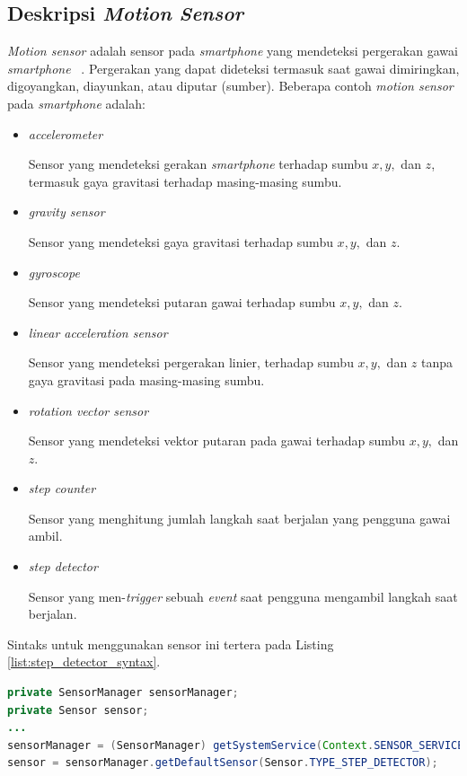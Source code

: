 \subsection{Deskripsi \textit{Motion Sensor}}
\textit{Motion sensor} adalah sensor pada \textit{smartphone} yang mendeteksi pergerakan gawai \textit{smartphone} ~\cite{motion-sensor}. Pergerakan yang dapat dideteksi termasuk saat gawai dimiringkan, digoyangkan, diayunkan, atau diputar (sumber). Beberapa contoh \textit{motion sensor} pada \textit{smartphone} adalah:
\begin{itemize}
	\item \textit{accelerometer}
	
	Sensor yang mendeteksi gerakan \textit{smartphone} terhadap sumbu $x, y,$ dan $z$, termasuk gaya gravitasi terhadap masing-masing sumbu.
	\item \textit{gravity sensor}
	
	Sensor yang mendeteksi gaya gravitasi terhadap sumbu $x, y,$ dan $z$.
	\item \textit{gyroscope}
	
	Sensor yang mendeteksi putaran gawai terhadap sumbu $x, y,$ dan $z$.
	\item \textit{linear acceleration sensor}
	
	Sensor yang mendeteksi pergerakan linier, terhadap sumbu $x, y,$ dan $z$ tanpa gaya gravitasi pada masing-masing sumbu.
	\item \textit{rotation vector sensor}
	
	Sensor yang mendeteksi vektor putaran pada gawai terhadap sumbu $x, y,$ dan $z$.
	
	\item \textit{step counter}
	
	Sensor yang menghitung jumlah langkah saat berjalan yang pengguna gawai ambil.
	\item \textit{step detector}
	
	Sensor yang men-\textit{trigger} sebuah \textit{event} saat pengguna mengambil langkah saat berjalan.
\end{itemize}

Sintaks untuk menggunakan sensor ini tertera pada Listing \ref{list:step_detector_syntax}.

\begin{lstlisting}[caption={Sintaks menggunakan sensor \textit{step detector}},label={list:step_detector_syntax},language=java]
private SensorManager sensorManager;
private Sensor sensor;
...
sensorManager = (SensorManager) getSystemService(Context.SENSOR_SERVICE);
sensor = sensorManager.getDefaultSensor(Sensor.TYPE_STEP_DETECTOR);
\end{lstlisting} 

